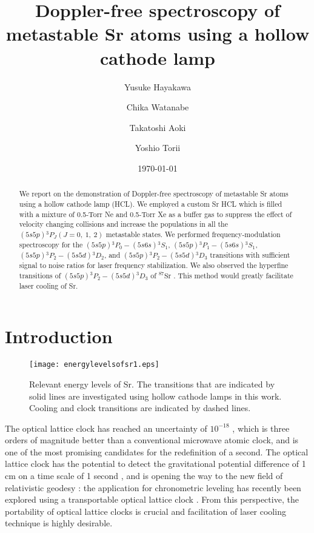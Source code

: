 \documentclass[twocolumn,10pt,a4paper]{article}
\title{Doppler-free spectroscopy of metastable Sr atoms using a hollow cathode lamp}
\author{Yusuke Hayakawa\and Chika Watanabe\and Takatoshi Aoki\and Yoshio Torii}
\date{\today}
\begin{document}
\maketitle

\begin{abstract}
	We report on the demonstration of Doppler-free spectroscopy of metastable Sr atoms using a hollow cathode lamp (HCL).  We employed a custom Sr HCL which is filled with a mixture of 0.5-Torr Ne and 0.5-Torr Xe as a buffer gas to suppress the effect of velocity changing collisions and increase the populations in all the $(5s5p){}^3P_J(J=0,\ 1,\ 2)$ metastable states. We performed frequency-modulation spectroscopy for the $(5s5p){}^3P_0-(5s6s){}^3S_1$, $(5s5p){}^3P_1-(5s6s){}^3S_1$, $(5s5p){}^3P_2-(5s5d){}^3D_2$, and $(5s5p){}^3P_2-(5s5d){}^3D_3$ transitions with sufficient signal to noise ratios for laser frequency stabilization.	We also observed the hyperfine transitions of $(5s5p){}^3P_2-(5s5d){}^3D_3$ of $^{87}\mathrm{Sr}$ . This method would greatly facilitate laser cooling of Sr.
\end{abstract}

\section{Introduction}

\begin{figure}[t]
	\begin{center}
		\texttt{[image: energylevelsofsr1.eps]}
		\caption{Relevant energy levels of Sr. The transitions that are indicated by solid lines are investigated using hollow cathode lamps in this work. Cooling and clock transitions are indicated by dashed lines.}
		\label{fig:energylevelofsr}
	\end{center}
\end{figure}

The optical lattice clock \cite{opticallatticeclock} has reached an uncertainty of $10^{-18}$ \cite{OLC10-18/2, OLC10-18/3}, which is three orders of magnitude better than a conventional microwave atomic clock, and is one of the most promising candidates for the redefinition of a second. The optical lattice clock has the potential to detect the gravitational potential difference of 1 cm on a time scale of 1 second \cite{KatoriOLC}, and is opening the way to the new field of relativistic geodesy \cite{geodesy}: the application for chronometric leveling has recently been explored using a transportable optical lattice clock \cite{transportableolc}. From this perspective, the portability of optical lattice clocks is crucial and facilitation of laser cooling technique is highly desirable.
\end{document}

